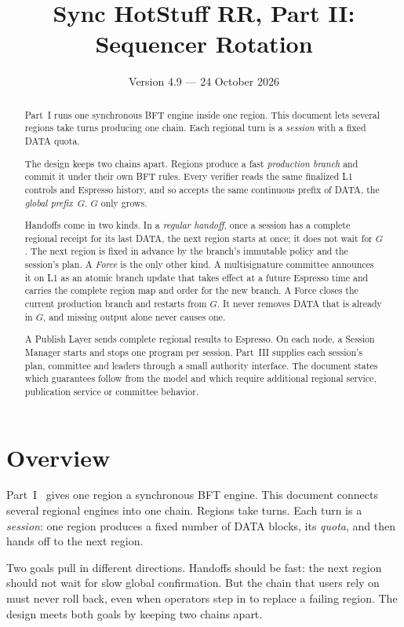 \documentclass[11pt,a4paper]{article}
\title{Sync HotStuff RR, Part II: Sequencer Rotation}
\author{}\date{Version 4.9 --- 24 October 2026}
\newcommand{\defterm}[1]{\textcolor{rrBlue}{\textit{#1}}}
\begin{document}
\maketitle
\begin{abstract}
Part~I runs one synchronous BFT engine inside one region. This document
lets several regions take turns producing one chain. Each regional turn
is a \emph{session} with a fixed DATA quota.

The design keeps two chains apart. Regions produce a fast
\emph{production branch} and commit it under their own BFT rules.
Every verifier reads
the same finalized L1 controls and Espresso history, and so accepts the
same continuous prefix of DATA, the \emph{global prefix}~$G$. $G$ only
grows.

Handoffs come in two kinds. In a \emph{regular handoff}, once a session
has a complete regional receipt for its last DATA, the next region starts
at once; it does not wait for $G$. The next region is fixed in advance by
the branch's immutable policy and the session's plan. A \emph{Force} is
the only other kind. A multisignature committee announces it on L1 as an
atomic branch update that takes effect at a future Espresso time and
carries the complete region map and order for the new branch. A Force closes the
current production branch and restarts from $G$. It never removes DATA
that is already in $G$, and missing output alone never causes one.

A Publish Layer sends complete regional results to Espresso. On each
node, a Session Manager starts and stops one program per session.
Part~III supplies each session's plan, committee and leaders through a
small authority interface. The document states which guarantees follow
from the model and which require additional regional service,
publication service or committee behavior.
\end{abstract}

\section{Overview}
\label{sec:overview}
Part~I~\cite{part1} gives one region a synchronous BFT engine.
This document connects several regional engines into one chain. Regions
take turns. Each turn is a \defterm{session}: one region produces a fixed
number of DATA blocks, its \emph{quota}, and then hands off to the next
region.

Two goals pull in different directions. Handoffs should be fast: the next
region should not wait for slow global confirmation. But the chain that
users rely on must never roll back, even when operators step in to
replace a failing region. The design meets both goals by keeping two
chains apart.
\end{document}
